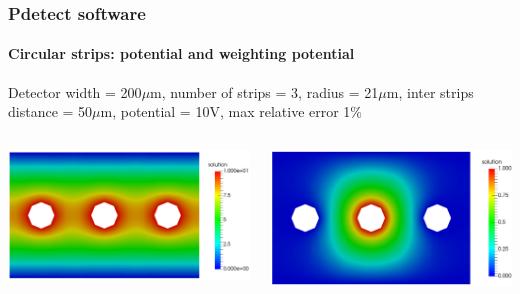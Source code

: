 \documentclass[14pt]{beamer}
\begin{document}
\begin{frame}
  \frametitle{Pdetect software}
  \framesubtitle{Circular strips: potential and weighting potential}

  \fontsize{10pt}{7.2}\selectfont

Detector width = 200$\mu$m, number of strips = 3, radius = 21$\mu$m,
 inter strips distance = 50$\mu$m, potential = 10V, max relative error 1$\%$

 \begin{columns}
   \begin{column}{0.5\textwidth}

     \begin{center}
     \includegraphics[scale=0.16]{images/circle_pot_3.png}
     \end{center}

   \end{column}

   \begin{column}{0.5\textwidth}
     \begin{center}
       \vspace{0.5em}
     \includegraphics[scale=0.16]{images/circle_pot_3_weight.png}
     \end{center}

   \end{column}
 \end{columns}

\end{frame}
\end{document}

